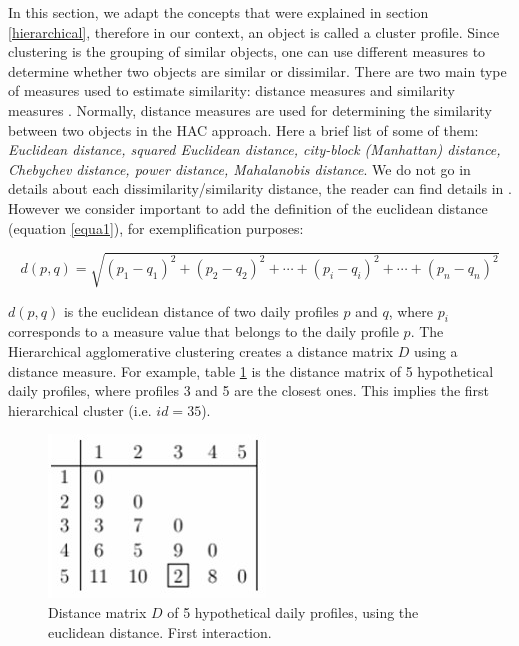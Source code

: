 In this section, we adapt the concepts that were explained in section \ref{hierarchical}, therefore in our context, an object is called a cluster profile. Since clustering is the grouping of similar objects, one can use different measures to determine whether two objects are similar or dissimilar. There are two main type of measures used to estimate similarity: distance measures and similarity measures \cite{maimon2007soft}. Normally, distance measures are used for determining the similarity between two objects in the HAC approach. Here a brief list of some of them: \textit{Euclidean distance, squared Euclidean distance, city-block (Manhattan) distance, Chebychev distance, power distance, Mahalanobis distance}. We do not go in details about each dissimilarity/similarity distance, the reader can find details in \cite{maimon2007soft,saraccli2013comparison,mullner2011modern}. However we consider important to add the definition of the euclidean distance (equation \ref{equa1}), for exemplification purposes: 

\begin{equation}
\label{equa1}
 \displaystyle d(p,q)={\sqrt {(p_{1}-q_{1})^{2}+(p_{2}-q_{2})^{2}+\cdots +(p_{i}-q_{i})^{2}+\cdots +(p_{n}-q_{n})^{2}}} 
\end{equation} 

$d(p,q)$ is the euclidean distance of two daily profiles $p$ and $q$, where $p_i$ corresponds to a measure value that belongs to the daily profile $p$. The Hierarchical agglomerative clustering creates a distance matrix $D$ using a distance measure. For example, table \ref{fig:matrix_1} is the distance matrix of 5 hypothetical daily profiles, where profiles 3 and 5 are the closest ones. This implies the first hierarchical cluster (i.e. $id= 35$). 

\begin{figure}[h!]
  \vspace{0.5em} %
  \includegraphics[scale=0.65]{Figures/distance_matrix_1.jpg}
  \caption{Distance matrix $D$ of 5 hypothetical daily profiles, using the euclidean distance. First interaction.}
  \label{fig:matrix_1}
\end{figure}

